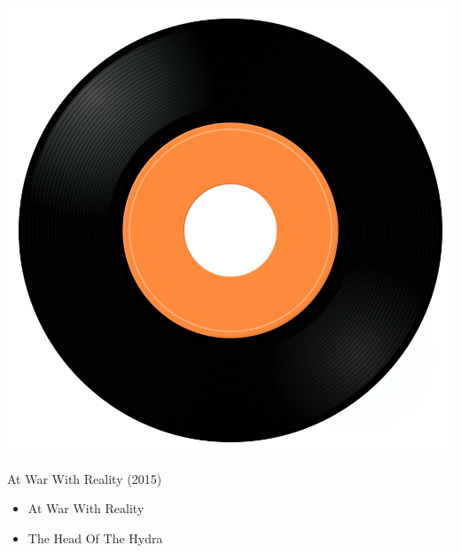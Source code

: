 \begin{minipage}[t]{0.25\textwidth}\vspace{0pt}
\captionsetup{type=figure}
\includegraphics[width=\textwidth]{Images/cover.png}
\caption*{At War With Reality (2015)}
\end{minipage}
\begin{minipage}[t]{0.25\textwidth}\vspace{0pt}
\begin{itemize}[nosep,leftmargin=1em,labelwidth=*,align=left]
	\setlength{\itemsep}{0pt}
	\item At War With Reality
	\item The Head Of The Hydra
\end{itemize}
\end{minipage}
